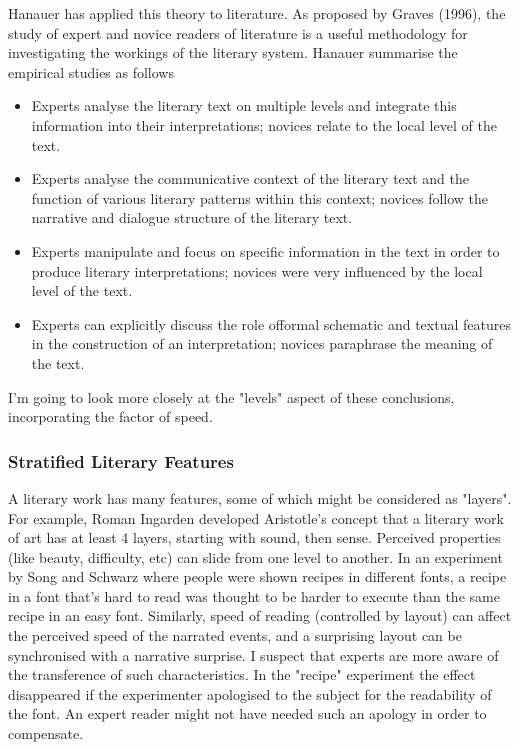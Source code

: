 \documentclass[11pt]{article}
\begin{document}
Hanauer has applied this theory to literature.  As proposed by Graves (1996), the study of expert
and novice readers of literature is a useful methodology for investigating
the workings of the literary system. Hanauer summarise the empirical
studies as follows
\begin{itemize}
\item 
Experts analyse the literary text on multiple levels and integrate this
information into their interpretations; novices relate to the local level
of the text.
\item  Experts analyse the communicative context of the literary
text and the function of various literary patterns within this context;
novices follow the narrative and dialogue structure of the literary text.

\item Experts manipulate and focus on specific information in the text in
order to produce literary interpretations; novices were very influenced by
the local level of the text.

\item Experts can explicitly discuss the role offormal schematic and textual features in the construction of an
interpretation; novices paraphrase the meaning of the text.

\end{itemize}


 I'm going to look more
closely at the "levels" aspect of these conclusions, incorporating  the factor of speed.


\subsubsection*{Stratified Literary Features}

 A literary work has many features, some of which might be
considered as "layers". For example, Roman Ingarden developed
Aristotle's concept that a literary work of art has at least 4 layers,
starting with sound, then sense. Perceived properties (like beauty,
difficulty, etc) can slide from one level to another. In an experiment by Song
  and Schwarz where people were shown
recipes in different fonts, a recipe in a font that's hard to read was
thought to be harder to execute than the same recipe in an easy font.
Similarly, speed of reading (controlled by layout) can affect the perceived 
speed of the narrated events, and a surprising layout can be synchronised 
with a narrative surprise. I suspect that experts are more aware of the transference of
such  characteristics. In the "recipe" experiment  the effect 
disappeared if the experimenter apologised to the subject for the readability
  of the font. An expert reader might not have needed such an apology in order
  to compensate.
\end{document}

